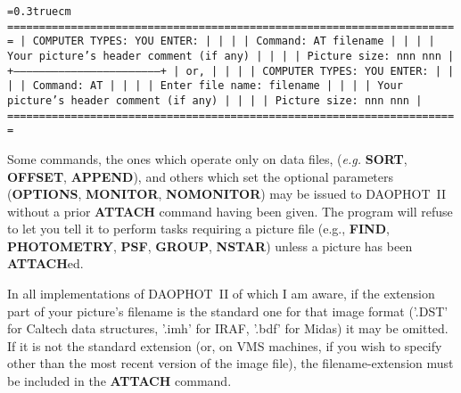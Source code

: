 \bigskip
{\noindent\obeylines\obeyspaces\frenchspacing\tt\baselineskip=0.3truecm
=======================================================================
| COMPUTER TYPES:                                      YOU ENTER:     |
|                                                                     |
| Command:                                             AT filename    |
|                                                                     |
|       Your picture's header comment (if any)                        |
|                                                                     |
|                   Picture size:   nnn  nnn                          |
+---------------------------------------------------------------------+
| or,                                                                 |
|                                                                     |
| COMPUTER TYPES:                                      YOU ENTER:     |
|                                                                     |
| Command:                                             AT             |
|                                                                     |
|                Enter file name:                      filename       |
|                                                                     |
|       Your picture's header comment (if any)                        |
|                                                                     |
|                   Picture size:   nnn  nnn                          |
=======================================================================
}
\bigskip

\noindent Some commands, the ones which operate only on data files,
({\it e.g.} {\bf SORT}, {\bf OFFSET}, {\bf APPEND}), and others which
set the optional parameters ({\bf OPTIONS}, {\bf MONITOR}, {\bf
NOMONITOR}) may be issued to DAOPHOT~II without a prior {\bf ATTACH}
command having been given.  The program will refuse to let you tell it
to perform tasks requiring a picture file (e.g., {\bf FIND}, {\bf
PHOTOMETRY}, {\bf PSF}, {\bf GROUP}, {\bf NSTAR}) unless a picture has
been {\bf ATTACH}ed.

In all implementations of DAOPHOT~II of which I am aware, if the
extension part of your picture's filename is the standard one for that
image format ('.DST' for Caltech data structures, '.imh' for IRAF,
'.bdf' for Midas) it may be omitted.  If it is not the standard
extension (or, on VMS machines, if you wish to specify other than the
most recent version of the image file), the filename-extension must be
included in the {\bf ATTACH} command.

